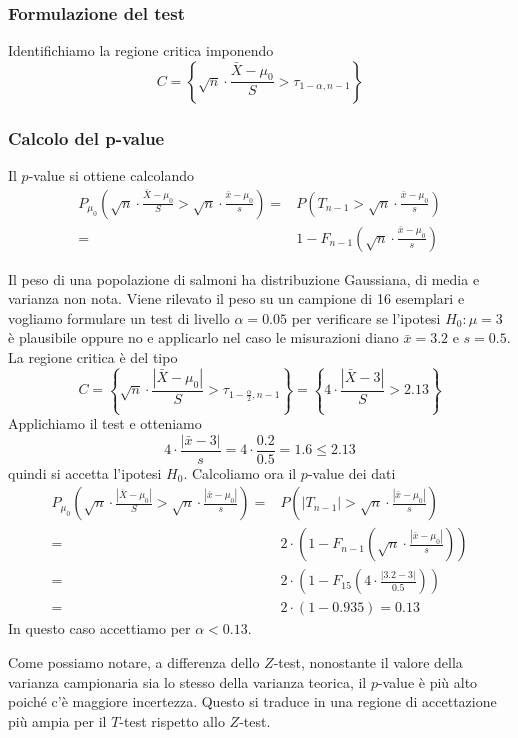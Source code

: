 \subsubsection{Formulazione del test}
Identifichiamo la regione critica imponendo
\[ C = \left\{ \sqrt{n} \cdot \frac{\bar{X} - \mu_0}{S} > \tau_{1 - \alpha, n-1} \right\} \]

\subsubsection{Calcolo del p-value}
Il $p$-value si ottiene calcolando
\begin{align*}
	P_{\mu_0} \left( \sqrt{n} \cdot \frac{\bar{X} - \mu_0}{S} >
	\sqrt{n} \cdot \frac{\bar{x} - \mu_0}{s} \right) = &
	P \left( T_{n-1} > \sqrt{n} \cdot \frac{\bar{x} - \mu_0}{s} \right) \\
	=                                                  &
	1 - F_{n-1} \left( \sqrt{n} \cdot \frac{\bar{x} - \mu_0}{s} \right)
\end{align*}

\begin{example}
	Il peso di una popolazione di salmoni ha distribuzione Gaussiana, di media e varianza non nota.
	Viene rilevato il peso su un campione di 16 esemplari e vogliamo formulare un test di livello
	$\alpha = 0.05$ per verificare se l'ipotesi $H_0 : \mu = 3$ è plausibile oppure no e applicarlo
	nel caso le misurazioni diano $\bar{x} = 3.2$ e $s = 0.5$. La regione critica è del tipo
	\[
		C = \left\{ \sqrt{n} \cdot \frac{|\bar{X} - \mu_0|}{S}
		> \tau_{1 - \frac{\alpha}{2}, n-1} \right\} =
		\left\{ 4 \cdot \frac{|\bar{X} - 3|}{S} > 2.13 \right\}
	\]
	Applichiamo il test e otteniamo
	\[ 4 \cdot \frac{|\bar{x} - 3|}{s} = 4 \cdot \frac{0.2}{0.5} = 1.6 \leq 2.13 \]
	quindi si accetta l'ipotesi $H_0$. Calcoliamo ora il $p$-value dei dati
	\begin{align*}
		P_{\mu_0} \left( \sqrt{n} \cdot \frac{|\bar{X} - \mu_0|}{S} >
		\sqrt{n} \cdot \frac{|\bar{x} - \mu_0|}{s} \right) = &
		P \left( |T_{n-1}| > \sqrt{n} \cdot \frac{|\bar{x} - \mu_0|}{s} \right)                 \\
		=                                                    &
		2 \cdot \left( 1 - F_{n-1} \left( \sqrt{n} \cdot
		\frac{|\bar{x} - \mu_0|}{s} \right) \right)                                             \\
		=                                                    &
		2 \cdot \left( 1 - F_{15} \left( 4 \cdot \frac{|3.2 - 3|}{0.5} \right) \right)          \\
		=                                                    & 2 \cdot \left( 1 - 0.935 \right)
		= 0.13
	\end{align*}
	In questo caso accettiamo per $\alpha < 0.13$.
\end{example}

Come possiamo notare, a differenza dello $Z$-test, nonostante il valore della varianza campionaria
sia lo stesso della varianza teorica, il $p$-value è più alto poiché c'è maggiore incertezza.
Questo si traduce in una regione di accettazione più ampia per il $T$-test rispetto allo $Z$-test.